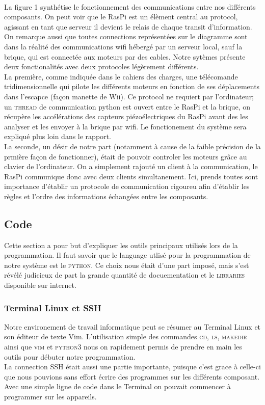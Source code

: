 \documentclass[twoside,twocolumn, 16pt]{article}
\begin{document}
\paragraph{} \indent La figure 1 synthétise le fonctionnement des communications entre nos différents composants. On peut voir que le RasPi est un élèment central au protocol, agissant en tant que serveur il devient le relais de chaque transit d'information. On remarque aussi que toutes connections représentées sur le diagramme sont dans la réalité des communications wifi hébergé par un serveur local, sauf la brique, qui est connectée aux moteurs par des cables. Notre sytèmes présente deux fonctionalités avec deux protocoles légèrement différents. \\
\indent La première, comme indiquée dans le cahiers des charges, une télécomande tridimensionnelle qui pilote les différents moteurs en fonction de ses déplacements dans l'escapce (façon manette de Wii). Ce protocol ne requiert par l'ordinateur; un \textsc{thread} de communication python est ouvert entre le RasPi et la brique, on récupère les accélérations des capteurs piézoélectriques du RasPi avant des les analyser et les envoyer à la brique par wifi. Le fonctionement du système sera expliqué plus loin dans le rapport. \\ 
\indent La seconde, un désir de notre part (notamment à cause de la faible précision de la prmière façon de fonctionner), était de pouvoir controler les moteurs grâce au clavier de l'ordinateur. On a simplement rajouté un client à la communication, le RasPi communique donc avec deux clients simultanement. Ici, prends toutes sont importance d'établir un protocole de communication rigoureu afin d'établir les règles et l'ordre des informations échangées entre les composants.


\subsection{Code}
Cette section a pour but d'expliquer les outils principaux utilisés lors de la programmation. Il faut savoir que le language utlisé pour la programmation de notre système est le \textsc{python}. Ce choix nous était d'une part imposé, mais s'est révélé judicieux de part la grande quantité de docuementation et le \textsc{libraries} disponible sur internet.\\
\subsubsection{Terminal Linux et SSH}
Notre environement de travail informatique peut se résumer au Terminal Linux et son éditeur de texte Vim. L'utilisation simple des commandes \textsc{cd, ls, makedir} ainsi que \textsc{vim} et \textsc{python3} nous on rapidement permis de prendre en main les outils pour débuter notre programmation. \\
\indent La connection SSH était aussi une partie importante, puisque c'est grace à celle-ci que nous pouvions sans effort écrire des programmes sur les différents composant. Avec une simple ligne de code dans le Terminal on pouvait commencer à programmer sur les appareils.
\end{document}
